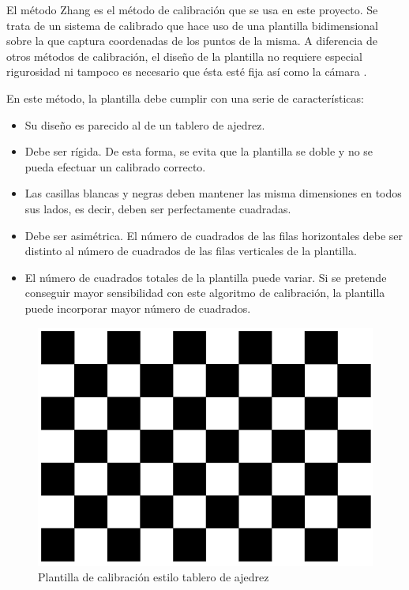 El método Zhang es el método de calibración que se usa en este proyecto. Se trata de un sistema de calibrado que hace uso de una plantilla bidimensional sobre la que captura coordenadas de los puntos de la misma. A diferencia de otros métodos de calibración, el diseño de la plantilla no requiere especial rigurosidad ni tampoco es necesario que ésta esté fija así como la cámara \citep{viala2008procedimiento}. 

En este método, la plantilla debe cumplir con una serie de características:
\begin{itemize}
    \item Su diseño es parecido al de un tablero de ajedrez. 
    \item Debe ser rígida. De esta forma, se evita que la plantilla se doble y no se pueda efectuar un calibrado correcto.
    \item Las casillas blancas y negras deben mantener las misma dimensiones en todos sus lados, es decir, deben ser perfectamente cuadradas.
    \item Debe ser asimétrica. El número de cuadrados de las filas horizontales debe ser distinto al número de cuadrados de las filas verticales de la plantilla.
    \item El número de cuadrados totales de la plantilla puede variar. Si se pretende conseguir mayor sensibilidad con este algoritmo de calibración, la plantilla puede incorporar mayor número de cuadrados. 
\end{itemize}

\begin{figure}
\centering
\includegraphics[scale = 0.4]{capitulo_02/figuras_dir/CHESSBOARD.jpg}
\caption{Plantilla de calibración estilo tablero de ajedrez}
\end{figure}


